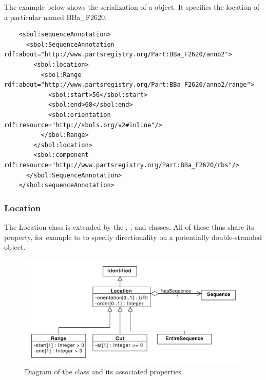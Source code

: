 The example below shows the serialization of a  object. It specifies the location of a particular  named BBa\_F2620.
\begin{lstlisting}
    <sbol:sequenceAnnotation>
      <sbol:SequenceAnnotation rdf:about="http://www.partsregistry.org/Part:BBa_F2620/anno2">
        <sbol:location>
          <sbol:Range rdf:about="http://www.partsregistry.org/Part:BBa_F2620/anno2/range">
            <sbol:start>56</sbol:start>
            <sbol:end>68</sbol:end>
            <sbol:orientation rdf:resource="http://sbols.org/v2#inline"/>
          </sbol:Range>
        </sbol:location>
        <sbol:component rdf:resource="http://www.partsregistry.org/Part:BBa_F2620/rbs"/>
      </sbol:SequenceAnnotation>
    </sbol:sequenceAnnotation>
\end{lstlisting}





\subsubsection{Location}
\label{sec:Location}
The Location class is extended by the , , and  classes.  All of these thus share its  property, for example to to specify directionality on a potentially double-stranded  object.

\begin{figure}[ht]
\begin{center}
\includegraphics[scale=0.6]{uml/location}
\caption[]{Diagram of the  class and its associated properties.}
\label{uml:location}
\end{center}
\end{figure}

